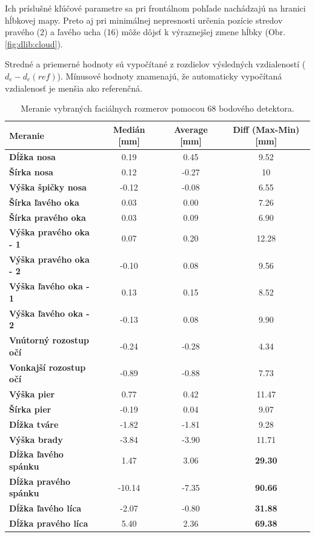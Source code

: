 Ich príslušné kľúčové parametre sa pri frontálnom pohľade nachádzajú na hranici hĺbkovej mapy. Preto aj pri minimálnej nepresnosti určenia pozície stredov pravého (2) a ľavého ucha (16) môže dôjsť k výraznejšej zmene hĺbky (Obr. \ref{fig:dlib:cloud}). 

Stredné a priemerné hodnoty sú vypočítané z rozdielov výsledných vzdialeností ($d_e-d_e(ref)$). Mínusové hodnoty znamenajú, že automaticky vypočítaná vzdialenosť je menšia ako referenčná.
 
\begin{table}[H]
	\caption{\label{tab:dlib:results} Meranie vybraných faciálnych rozmerov pomocou 68 bodového detektora.}
	\centering
	\begin{tabular}{lccc}
		\toprule
		\textbf{Meranie} & \textbf{Medián [mm]} & \textbf{Average [mm]} & \textbf{Diff (Max-Min) [mm]} \\ 
		\midrule
		\textbf{Dĺžka nosa} 			& 0.19 	& 0.45 	& 9.52	\\
		\textbf{Šírka nosa} 			& 0.12	& -0.27 & 10	\\
		\textbf{Výška špičky nosa} 		& -0.12	& -0.08 & 6.55	\\
		\textbf{Šírka ľavého oka} 		& 0.03	& 0.00	& 7.26	\\
		\textbf{Šírka pravého oka} 		& 0.03 	& 0.09	& 6.90	\\
		\textbf{Výška pravého oka - 1} 	& 0.07	& 0.20	& 12.28	\\
		\textbf{Výška pravého oka - 2} 	& -0.10	& 0.08	& 9.56	\\
		\textbf{Výška ľavého oka - 1} 	& 0.13	& 0.15	& 8.52	\\
		\textbf{Výška ľavého oka - 2} 	& -0.13 & 0.08	& 9.90	\\
		\textbf{Vnútorný rozostup očí} 	& -0.24	& -0.28	& 4.34	\\
		\textbf{Vonkajší rozostup očí} 	& -0.89	& -0.88	& 7.73	\\
		\textbf{Výška pier} 			& 0.77	& 0.42	& 11.47	\\
		\textbf{Šírka pier} 			& -0.19 & 0.04	& 9.07	\\
		\textbf{Dĺžka tváre} 			& -1.82	& -1.81	& 9.28	\\
		\textbf{Výška brady} 			& -3.84	& -3.90	& 11.71	\\
		\textbf{Dĺžka ľavého spánku} 	& 1.47	& 3.06	& \textbf{29.30}	\\
		\textbf{Dĺžka pravého spánku} 	& -10.14& -7.35	& \textbf{90.66}	\\
		\textbf{Dĺžka ľavého líca} 		& -2.07	& -0.80	& \textbf{31.88}	\\
		\textbf{Dĺžka pravého líca} 	& 5.40	& 2.36	& \textbf{69.38}	\\
		\bottomrule
	\end{tabular}
\end{table}

